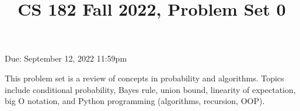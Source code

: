\documentclass[12pt]{amsart}
\title{CS 182 Fall 2022, Problem Set 0}
\theoremstyle{definition}
\theoremstyle{remark}
\newcommand{\1}{\mathds{1}}
\begin{document}
\maketitle

\vspace*{-0.25in}
\centerline{Due: September 12, 2022 11:59pm}

\begin{center}
\end{center}
\vspace*{0.15in}


\noindent This problem set is a review of concepts in probability and algorithms. Topics include conditional probability, Bayes rule, union bound, linearity of expectation, big O notation, and Python programming (algorithms, recursion, OOP).
\vspace*{0.35in}
\end{document}
